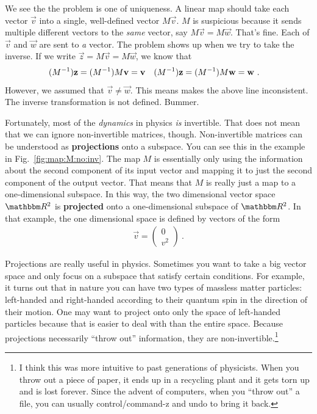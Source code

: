 \documentclass[12pt, oneside]{report}    %
\begin{document}
% 
We see the the problem is one of uniqueness. A linear map should take each vector $\vec{v}$ into a single, well-defined vector $M\vec{v}$. $M$ is suspicious because it sends multiple different vectors to the \emph{same} vector, say $M\vec{v} = M\vec{w}$. That's fine. Each of $\vec{v}$ and $\vec{w}$ are sent to \emph{a} vector. The problem shows up when we try to take the inverse. If we write $\vec{z} = M\vec{v} = M\vec{w}$, we know that
\begin{align}
    (M^{-1})\mathbf{z} = (M^{-1})M\mathbf{v} &= \mathbf{v}
    &
    (M^{-1})\mathbf{z} = (M^{-1})M\mathbf{w} &= \mathbf{w} \ .
\end{align}
However, we assumed that $\vec{v} \neq \vec{w}$. This means makes the above line inconsistent. The inverse transformation is not defined. Bummer.

Fortunately, most of the \emph{dynamics} in physics \emph{is} invertible. That does not mean that we can ignore non-invertible matrices, though. Non-invertible matrices can be understood as \textbf{projections} onto a subspace. You can see this in the example in Fig.~\ref{fig:map:M:no:inv}. The map $M$ is essentially only using the information about the second component of its input vector and mapping it to just the second component of the output vector. That means that $M$ is really just a map to a one-dimensional subspace. In this way, the two dimensional vector space $\RR ^2$ is \textbf{projected} onto a one-dimensional subspace of $\RR ^2$. In that example, the one dimensional space is defined by vectors of the form
\begin{align}
    \vec{v} = 
    \begin{pmatrix}
    0\\ v^2    
    \end{pmatrix} \ .
\end{align}

Projections are really useful in physics. Sometimes you want to take a big vector space and only focus on a subspace that satisfy certain conditions. For example, it turns out that in nature you can have two types of massless matter particles: left-handed and right-handed according to their quantum spin in the direction of their motion. One may want to project onto only the space of left-handed particles because that is easier to deal with than the entire space. Because projections necessarily ``throw out'' information, they are non-invertible.\footnote{I think this was more intuitive to past generations of physicists. When you throw out a piece of paper, it ends up in a recycling plant and it gets torn up and is lost forever. Since the advent of computers, when you ``throw out'' a file, you can usually control/command-z and undo to bring it back.}
\end{document}
